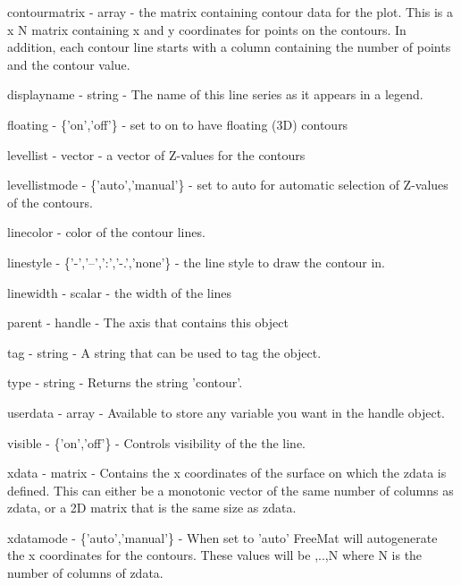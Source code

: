 \begin{DoxyItemize}
\item {\ttfamily contourmatrix} -\/ {\ttfamily array} -\/ the matrix containing contour data for the plot. This is a { x N} matrix containing x and y coordinates for points on the contours. In addition, each contour line starts with a column containing the number of points and the contour value.  
\item {\ttfamily displayname} -\/ {\ttfamily string} -\/ The name of this line series as it appears in a legend.  
\item {\ttfamily floating} -\/ {\ttfamily \{'on','off'\}} -\/ set to on to have floating (3\-D) contours  
\item {\ttfamily levellist} -\/ {\ttfamily vector} -\/ a vector of Z-\/values for the contours  
\item {\ttfamily levellistmode} -\/ {\ttfamily \{'auto','manual'\}} -\/ set to auto for automatic selection of Z-\/values of the contours.  
\item {\ttfamily linecolor} -\/ color of the contour lines.  
\item {\ttfamily linestyle} -\/ {\ttfamily \{'-\/','--','\-:','-\/.','none'\}} -\/ the line style to draw the contour in.  
\item {\ttfamily linewidth} -\/ {\ttfamily scalar} -\/ the width of the lines  
\item {\ttfamily parent} -\/ {\ttfamily handle} -\/ The axis that contains this object  
\item {\ttfamily tag} -\/ {\ttfamily string} -\/ A string that can be used to tag the object.  
\item {\ttfamily type} -\/ {\ttfamily string} -\/ Returns the string {\ttfamily 'contour'}.  
\item {\ttfamily userdata} -\/ {\ttfamily array} -\/ Available to store any variable you want in the handle object.  
\item {\ttfamily visible} -\/ {\ttfamily \{'on','off'\}} -\/ Controls visibility of the the line.  
\item {\ttfamily xdata} -\/ {\ttfamily matrix} -\/ Contains the x coordinates of the surface on which the zdata is defined. This can either be a monotonic vector of the same number of columns as {\ttfamily zdata}, or a 2\-D matrix that is the same size as {\ttfamily zdata}.  
\item {\ttfamily xdatamode} -\/ {\ttfamily \{'auto','manual'\}} -\/ When set to {\ttfamily 'auto'} Free\-Mat will autogenerate the x coordinates for the contours. These values will be {,..,N} where {\ttfamily N} is the number of columns of {\ttfamily zdata}.  

\end{DoxyItemize}
